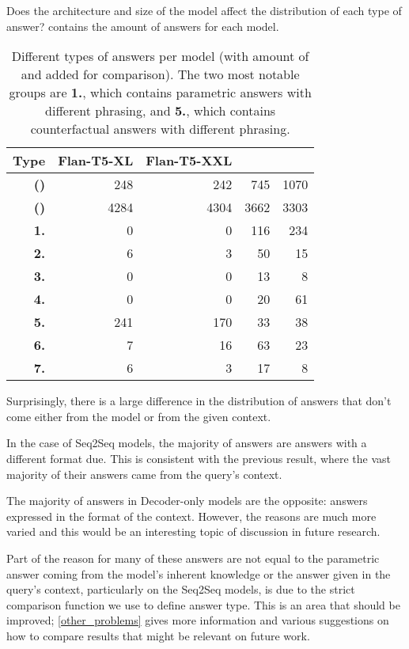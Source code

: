 Does the architecture and size of the model affect the distribution of each type of \Other{} answer?
 contains the amount of answers for each model.

\begin{table}[ht]
	\centering
	\footnotesize
	\begin{tabular}{>{\bfseries}r | r r r r}
		\toprule
			\bfseries Type & \ttfamily\scriptsize Flan-T5-XL & \ttfamily\scriptsize Flan-T5-XXL & \ttfamily\scriptsize \llamaparbox{} & \ttfamily\scriptsize \bigllamaparbox{} \\
		\midrule
			(\Parametric{}) & 248 & 242 & 745 & 1070 \\
			(\Contextual{}) & 4284 & 4304 & 3662 & 3303 \\
		\midrule
			1. & 0 & 0 & 116 & 234 \\
			2. & 6 & 3 & 50 & 15 \\
			3. & 0 & 0 & 13 & 8 \\
			4. & 0 & 0 & 20 & 61 \\
			5. & 241 & 170 & 33 & 38 \\
			6. & 7 & 16 & 63 & 23 \\
			7. & 6 & 3 & 17 & 8 \\
		\bottomrule
	\end{tabular}
	\caption{Different types of \Other{} answers per model (with amount of \Parametric{} and \Contextual{} added for comparison). The two most notable groups are \textbf{1.}, which contains parametric answers with different phrasing, and \textbf{5.}, which contains counterfactual answers with different phrasing.}
	\label{other_results_category}
\end{table}

Surprisingly, there is a large difference in the distribution of answers that don't come either from the model or from the given context.

In the case of Seq2Seq models, the majority of \Other{} answers are \Contextual{} answers with a different format due.
This is consistent with the previous result, where the vast majority of their answers came from the query's context.

The majority of \Other{} answers in Decoder-only models are the opposite: \Parametric{} answers expressed in the format of the context.
However, the reasons are much more varied and this would be an interesting topic of discussion in future research.

Part of the reason for many of these answers are not equal to the parametric answer coming from the model's inherent knowledge or the answer given in the query's context, particularly on the Seq2Seq models, is due to the strict comparison function we use to define answer type.
This is an area that should be improved; \cref{other_problems} gives more information and various suggestions on how to compare results that might be relevant on future work.

